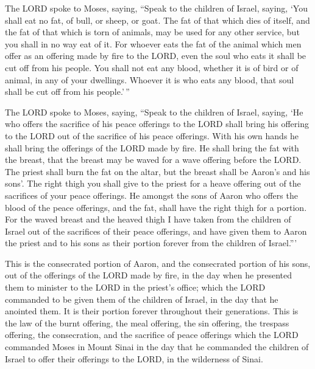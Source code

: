  The LORD spoke to Moses, saying,  ``Speak to
the children of Israel, saying, `You shall eat no fat, of bull, or
sheep, or goat.  The fat of that which dies of itself, and
the fat of that which is torn of animals, may be used for any other
service, but you shall in no way eat of it.  For whoever
eats the fat of the animal which men offer as an offering made by fire
to the LORD, even the soul who eats it shall be cut off from his people.
 You shall not eat any blood, whether it is of bird or of
animal, in any of your dwellings.  Whoever it is who eats
any blood, that soul shall be cut off from his people.'\,''

 The LORD spoke to Moses, saying,  ``Speak to
the children of Israel, saying, `He who offers the sacrifice of his
peace offerings to the LORD shall bring his offering to the LORD out of
the sacrifice of his peace offerings.  With his own hands
he shall bring the offerings of the LORD made by fire. He shall bring
the fat with the breast, that the breast may be waved for a wave
offering before the LORD.  The priest shall burn the fat on
the altar, but the breast shall be Aaron's and his sons'. 
The right thigh you shall give to the priest for a heave offering out of
the sacrifices of your peace offerings.  He amongst the
sons of Aaron who offers the blood of the peace offerings, and the fat,
shall have the right thigh for a portion.  For the waved
breast and the heaved thigh I have taken from the children of Israel out
of the sacrifices of their peace offerings, and have given them to Aaron
the priest and to his sons as their portion forever from the children of
Israel.'''

 This is the consecrated portion of Aaron, and the
consecrated portion of his sons, out of the offerings of the LORD made
by fire, in the day when he presented them to minister to the LORD in
the priest's office;  which the LORD commanded to be given
them of the children of Israel, in the day that he anointed them. It is
their portion forever throughout their generations.  This
is the law of the burnt offering, the meal offering, the sin offering,
the trespass offering, the consecration, and the sacrifice of peace
offerings  which the LORD commanded Moses in Mount Sinai in
the day that he commanded the children of Israel to offer their
offerings to the LORD, in the wilderness of Sinai.

